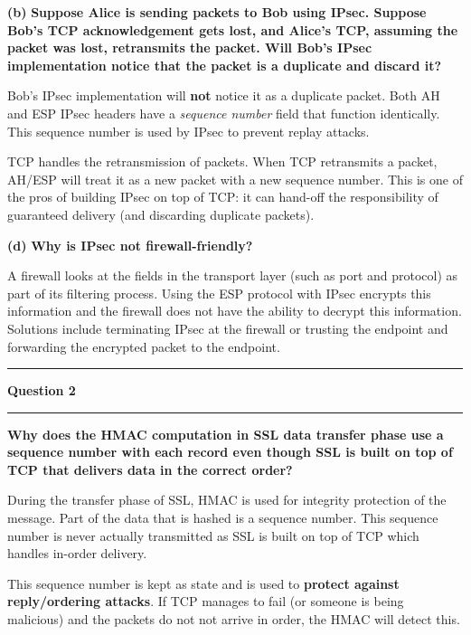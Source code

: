 \documentclass[11pt]{article}
\newcommand\question[2]{\vspace{.25in}\hrule\textbf{#1}\vspace{.5em}\hrule\vspace{.10in}}
\renewcommand\part[1]{\vspace{.10in}\textbf{(#1)}}
\begin{document}
\part{b} \textbf{Suppose Alice is sending packets to Bob using IPsec. Suppose Bob's TCP acknowledgement gets lost, and Alice's TCP, assuming the packet was lost, retransmits the packet. Will Bob's IPsec implementation notice that the packet is a duplicate and discard it?}

Bob's IPsec implementation will \textbf{not} notice it as a duplicate packet. Both AH and ESP IPsec headers have a \textit{sequence number} field that function identically. This sequence number is used by IPsec to prevent replay attacks.

TCP handles the retransmission of packets. When TCP retransmits a packet, AH/ESP will treat it as a new packet with a new sequence number. This is one of the pros of building IPsec on top of TCP: it can hand-off the responsibility of guaranteed delivery (and discarding duplicate packets).

\part{d} \textbf{Why is IPsec not firewall-friendly?}

A firewall looks at the fields in the transport layer (such as port and protocol) as part of its filtering process. Using the ESP protocol with IPsec encrypts this information and the firewall does not have the ability to decrypt this information. Solutions include terminating IPsec at the firewall or trusting the endpoint and forwarding the encrypted packet to the endpoint.

\question{Question 2}

\part{a} \textbf{Why does the HMAC computation in SSL data transfer phase use a sequence number with each record even though SSL is built on top of TCP that delivers data in the correct order?}

During the transfer phase of SSL, HMAC is used for integrity protection of the message. Part of the data that is hashed is a sequence number. This sequence number is never actually transmitted as SSL is built on top of TCP which handles in-order delivery. 

This sequence number is kept as state and is used to \textbf{protect against reply/ordering attacks}. If TCP manages to fail (or someone is being malicious) and the packets do not not arrive in order, the HMAC will detect this.
\end{document}

